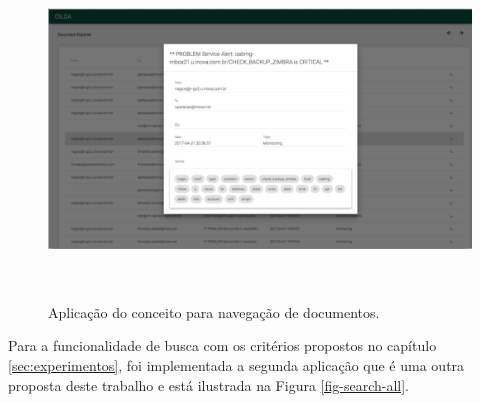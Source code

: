 \documentclass[12pt,a4paper]{article}
\begin{document}
\begin{figure}[H]
  \centering
  \includegraphics[height=9cm]{images/figure_8.png}
  \caption{Aplicação do conceito para navegação de documentos.}
  \label{fig-doc-explorer}
\end{figure}

Para a funcionalidade de busca com os critérios propostos no capítulo \ref{sec:experimentos}, foi implementada a segunda aplicação que é uma outra proposta deste trabalho e está ilustrada na Figura \ref{fig-search-all}.
\end{document}
